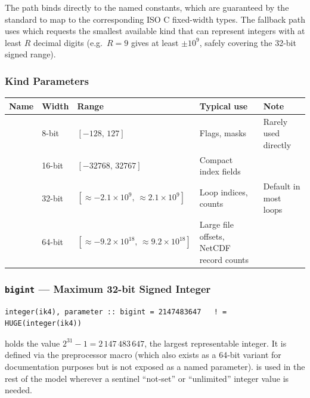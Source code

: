 The  path binds directly to the  named
constants, which are guaranteed by the standard to map to the corresponding
ISO C fixed-width types. The fallback path uses 
which requests the smallest available kind that can represent integers with at
least $R$ decimal digits (e.g.\ $R=9$ gives at least $\pm10^9$, safely
covering the 32-bit signed range).

\subsubsection{Kind Parameters}

\begin{longtable}{L{2.5cm} L{2cm} L{3cm} L{3cm} L{4.5cm}}
  \toprule
  \textbf{Name} & \textbf{Width} & \textbf{Range} & \textbf{Typical use} & \textbf{Note} \\
  \midrule
  \endhead
  \bottomrule
  \endfoot
   & 8-bit  & $[-128,\,127]$                     & Flags, masks           & Rarely used directly \\
   & 16-bit & $[-32768,\,32767]$                 & Compact index fields   & \\
   & 32-bit & $[\approx{-2.1\times10^9},\,\approx{2.1\times10^9}]$ & Loop indices, counts & Default in most loops \\
   & 64-bit & $[\approx{-9.2\times10^{18}},\,\approx{9.2\times10^{18}}]$ & Large file offsets, NetCDF record counts & \\
\end{longtable}

\subsubsection{\texttt{bigint} --- Maximum 32-bit Signed Integer}

\begin{lstlisting}
integer(ik4), parameter :: bigint = 2147483647   ! = HUGE(integer(ik4))
\end{lstlisting}

 holds the value $2^{31}-1 = 2\,147\,483\,647$, the largest
representable  integer. It is defined via the preprocessor macro
 (which also exists as a 64-bit variant
 for documentation purposes but is not exposed
as a named parameter).  is used in the rest of the model wherever
a sentinel ``not-set'' or ``unlimited'' integer value is needed.

